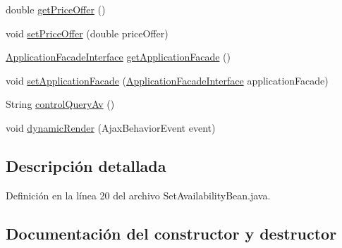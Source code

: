 \begin{DoxyCompactItemize}
\item 
double \mbox{\hyperlink{classcom_1_1ruralhousejsf_1_1model_1_1availability_1_1_set_availability_bean_a264ab7e009d744abc40af63581bbdb05}{get\+Price\+Offer}} ()
\item 
void \mbox{\hyperlink{classcom_1_1ruralhousejsf_1_1model_1_1availability_1_1_set_availability_bean_a89e2a4719579d3e5865dd940bf7c5649}{set\+Price\+Offer}} (double price\+Offer)
\item 
\mbox{\hyperlink{interfacecom_1_1ruralhousejsf_1_1business_logic_1_1_application_facade_interface}{Application\+Facade\+Interface}} \mbox{\hyperlink{classcom_1_1ruralhousejsf_1_1model_1_1availability_1_1_set_availability_bean_af9224c4f771a27c9e3c9218d1700bbcb}{get\+Application\+Facade}} ()
\item 
void \mbox{\hyperlink{classcom_1_1ruralhousejsf_1_1model_1_1availability_1_1_set_availability_bean_ae9e4275c9099e9b5ccfdcc07a7592c65}{set\+Application\+Facade}} (\mbox{\hyperlink{interfacecom_1_1ruralhousejsf_1_1business_logic_1_1_application_facade_interface}{Application\+Facade\+Interface}} application\+Facade)
\item 
String \mbox{\hyperlink{classcom_1_1ruralhousejsf_1_1model_1_1availability_1_1_set_availability_bean_ae291ccc259e4e415f8ec7f52fb4a28da}{control\+Query\+Av}} ()
\item 
void \mbox{\hyperlink{classcom_1_1ruralhousejsf_1_1model_1_1availability_1_1_set_availability_bean_aabfcb63b56f07d5d00cf4c44f413a6f8}{dynamic\+Render}} (Ajax\+Behavior\+Event event)
\end{DoxyCompactItemize}


\subsection{Descripción detallada}


Definición en la línea 20 del archivo Set\+Availability\+Bean.\+java.



\subsection{Documentación del constructor y destructor}
\mbox{\label{classcom_1_1ruralhousejsf_1_1model_1_1availability_1_1_set_availability_bean_a5eb9c427878e584a4850a8f48fcdbdb7}} 
